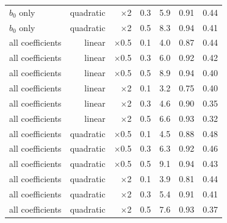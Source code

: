 \begin{table}[htbp]
\begin{tabular}{lrrrrrr}
$b_0$ only & quadratic & $\times$2 & 0.3 & 5.9 & 0.91 & 0.44 \\
$b_0$ only & quadratic & $\times$2 & 0.5 & 8.3 & 0.94 & 0.41 \\
all coefficients & linear & $\times$0.5 & 0.1 & 4.0 & 0.87 & 0.44 \\
all coefficients & linear & $\times$0.5 & 0.3 & 6.0 & 0.92 & 0.42 \\
all coefficients & linear & $\times$0.5 & 0.5 & 8.9 & 0.94 & 0.40 \\
all coefficients & linear & $\times$2 & 0.1 & 3.2 & 0.75 & 0.40 \\
all coefficients & linear & $\times$2 & 0.3 & 4.6 & 0.90 & 0.35 \\
all coefficients & linear & $\times$2 & 0.5 & 6.6 & 0.93 & 0.32 \\
all coefficients & quadratic & $\times$0.5 & 0.1 & 4.5 & 0.88 & 0.48 \\
all coefficients & quadratic & $\times$0.5 & 0.3 & 6.3 & 0.92 & 0.46 \\
all coefficients & quadratic & $\times$0.5 & 0.5 & 9.1 & 0.94 & 0.43 \\
all coefficients & quadratic & $\times$2 & 0.1 & 3.9 & 0.81 & 0.44 \\
all coefficients & quadratic & $\times$2 & 0.3 & 5.4 & 0.91 & 0.41 \\
all coefficients & quadratic & $\times$2 & 0.5 & 7.6 & 0.93 & 0.37 \\
\bottomrule
\end{tabular}
\end{table}
